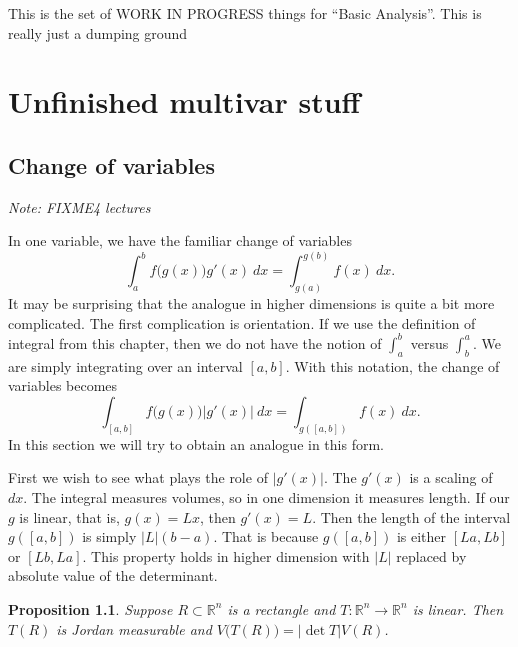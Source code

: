 \documentclass[12pt]{book}
\newcommand{\sabs}[1]{\lvert {#1} \rvert}
\newcommand{\R}{{\mathbb{R}}}
\newcommand{\sectionnotes}[1]{\noindent \emph{Note: #1} \medskip \par}
\newcommand{\sectionnewpage}{\clearpage}
\theoremstyle{plain}
\newtheorem{prop}[thm]{Proposition}
\theoremstyle{remark}
\theoremstyle{definition}
\theoremstyle{exercise}
\theoremstyle{example}
\begin{document}
This is the set of WORK IN PROGRESS things for
``Basic Analysis''.   This is really just a dumping ground


\chapter{Unfinished multivar stuff}



\sectionnewpage
\section{Change of variables}
\label{sec:mvchangeofvars}

\sectionnotes{FIXME4 lectures}

In one variable, we have the familiar change of variables
\begin{equation*}
\int_a^b f\bigl(g(x)\bigr) g'(x)~ dx = 
\int_{g(a)}^{g(b)} f(x) ~ dx .
\end{equation*}
It may be surprising that the analogue in higher dimensions is quite
a bit more complicated.  The first complication is orientation.  If we use
the definition of integral from this chapter, then we do not have the notion
of $\int_a^b$ versus $\int_b^a$.  We are simply integrating over an
interval $[a,b]$.  With this notation, the change of variables becomes
\begin{equation*}
\int_{[a,b]} f\bigl(g(x)\bigr) \sabs{g'(x)}~ dx = 
\int_{g([a,b])} f(x) ~ dx .
\end{equation*}
In this section we will try to obtain an analogue in this form.

First we wish to see what plays the role of $\sabs{g'(x)}$.  
The $g'(x)$ is a scaling of $dx$.  The integral measures volumes, so in one
dimension it measures length.  If our $g$ is linear, that is, $g(x)=Lx$, then
$g'(x) = L$.  Then the length of the interval $g([a,b])$ is simply
$\sabs{L}(b-a)$.  That is because $g([a,b])$ is either $[La,Lb]$ or
$[Lb,La]$.  This property holds in higher dimension with $\sabs{L}$ replaced
by absolute value of the determinant.

\begin{prop} \label{prop:volrectdet}
Suppose $R \subset \R^n$ is a rectangle
and $T \colon \R^n \to \R^n$ is linear.  Then
$T(R)$ is Jordan measurable and $V\bigl(T(R)\bigr) = \sabs{\det T} V(R)$.
\end{prop}
\end{document}
